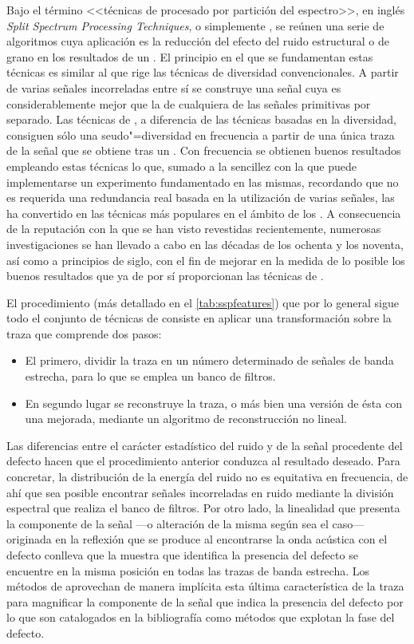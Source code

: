 Bajo el término <<técnicas de procesado por partición del espectro>>, en
inglés \emph{Split Spectrum Processing Techniques}, o simplemente
, se reúnen una serie de algoritmos cuya aplicación es la
reducción del efecto del ruido estructural o de grano en los resultados de
un . El principio en el que se fundamentan estas técnicas es
similar al que rige las técnicas de diversidad convencionales. A partir de
varias señales incorreladas entre sí se construye una señal cuya 
es considerablemente mejor que la  de cualquiera de las señales
primitivas por separado. Las técnicas de , a diferencia de las
técnicas basadas en la diversidad, consiguen sólo una seudo"=diversidad en
frecuencia a partir de una única traza de la señal que se obtiene tras un
. Con frecuencia se obtienen buenos resultados empleando estas
técnicas lo que, sumado a la sencillez con la que puede implementarse un
experimento fundamentado en las mismas, recordando que no es requerida una
redundancia real basada en la utilización de varias señales, las ha
convertido en las técnicas más populares en el ámbito de los . A
consecuencia de la reputación con la que se han visto revestidas
recientemente, numerosas investigaciones se han llevado a cabo en las
décadas de los ochenta y los noventa, así como a principios de siglo, con
el fin de mejorar en la medida de lo posible los buenos resultados que ya
de por sí proporcionan las técnicas de .

El procedimiento (más detallado en el \cref{tab:sspfeatures}) que por lo
general sigue todo el conjunto de técnicas de  consiste en aplicar
una transformación sobre la traza que comprende dos pasos:

\begin{itemize}
	\item El primero, dividir la traza en un número determinado de
		señales de banda estrecha, para lo que se emplea un banco
		de filtros.
	\item En segundo lugar se reconstruye la traza, o más bien una
		versión de ésta con una  mejorada, mediante un
		algoritmo de reconstrucción no lineal.
\end{itemize}

Las diferencias entre el carácter estadístico del ruido y de la señal
procedente del defecto hacen que el procedimiento anterior conduzca al
resultado deseado. Para concretar, la distribución de la energía del ruido
no es equitativa en frecuencia, de ahí que sea posible encontrar señales
incorreladas en ruido mediante la división espectral que realiza el banco
de filtros. Por otro lado, la linealidad que presenta la componente de la
señal ---o alteración de la misma según sea el caso--- originada en la
reflexión que se produce al encontrarse la onda acústica con el defecto
conlleva que la muestra que identifica la presencia del defecto se
encuentre en la misma posición en todas las trazas de banda estrecha. Los
métodos de  aprovechan de manera implícita esta última
característica de la traza para magnificar la componente de la señal que
indica la presencia del defecto por lo que son catalogados en la
bibliografía como métodos que explotan la fase del defecto.


